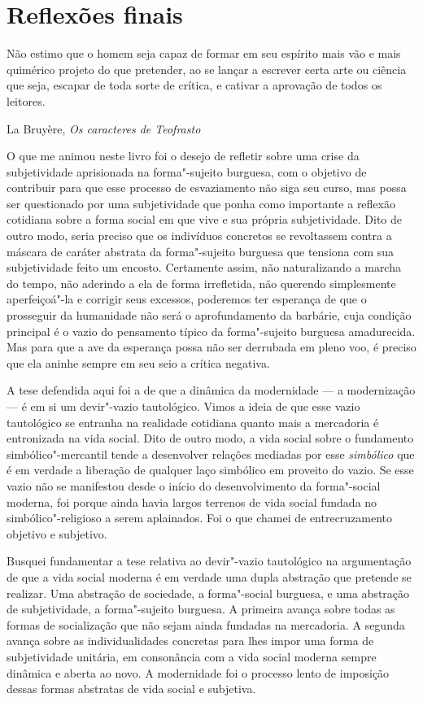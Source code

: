 \chapter{Reflexões finais}

\epigraph{Não estimo que o homem seja capaz de formar em seu espírito mais vão e
mais quimérico projeto do que pretender, ao se lançar a escrever certa
arte ou ciência que seja, escapar de toda sorte de crítica, e cativar a
aprovação de todos os leitores.}{La Bruyère, \emph{Os caracteres de Teofrasto}}

O que me animou neste livro foi o desejo de refletir sobre uma crise da
subjetividade aprisionada na forma"-sujeito burguesa, com o objetivo de
contribuir para que esse processo de esvaziamento não siga seu curso,
mas possa ser questionado por uma subjetividade que ponha como
importante a reflexão cotidiana sobre a forma social em que vive e sua
própria subjetividade. Dito de outro modo, seria preciso que os
indivíduos concretos se revoltassem contra a máscara de caráter abstrata
da forma"-sujeito burguesa que tensiona com sua subjetividade feito um
encosto. Certamente assim, não naturalizando a marcha do tempo, não
aderindo a ela de forma irrefletida, não querendo simplesmente
aperfeiçoá"-la e corrigir seus excessos, poderemos ter esperança de que o
prosseguir da humanidade não será o aprofundamento da barbárie, cuja
condição principal é o vazio do pensamento típico da forma"-sujeito
burguesa amadurecida. Mas para que a ave da esperança possa não ser
derrubada em pleno voo, é preciso que ela aninhe sempre em seu seio a
crítica negativa.

A tese defendida aqui foi a de que a dinâmica da
modernidade --- a modernização --- é em si um devir"-vazio tautológico.
Vimos a ideia de que esse vazio tautológico se entranha na
realidade cotidiana quanto mais a mercadoria é entronizada na vida
social. Dito de outro modo, a vida social sobre o fundamento
simbólico"-mercantil tende a desenvolver relações mediadas por esse
\emph{simbólico} que é em verdade a liberação de qualquer laço simbólico
em proveito do vazio. Se esse vazio não se manifestou desde o início do
desenvolvimento da forma"-social moderna, foi porque ainda havia largos
terrenos de vida social fundada no simbólico"-religioso a serem
aplainados. Foi o que chamei de entrecruzamento objetivo e subjetivo.

Busquei fundamentar a tese relativa ao devir"-vazio tautológico na
argumentação de que a vida social moderna é em verdade uma dupla
abstração que pretende se realizar. Uma abstração de sociedade, a
forma"-social burguesa, e uma abstração de subjetividade, a forma"-sujeito
burguesa. A primeira avança sobre todas as formas de socialização que
não sejam ainda fundadas na mercadoria. A segunda avança sobre as
individualidades concretas para lhes impor uma forma de subjetividade
unitária, em consonância com a vida social moderna sempre dinâmica e
aberta ao novo. A modernidade foi o processo lento de imposição dessas
formas abstratas de vida social e subjetiva.


